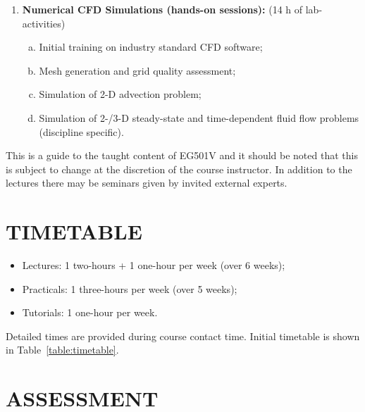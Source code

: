 \documentclass[12pts,a4paper,amsmath,amssymb,floatfix]{article}%
\begin{document}
\begin{enumerate}[{\bf Module 1}]
\item {\bf Numerical CFD Simulations (hands-on sessions):} (14 h of lab-activities)
   \begin{enumerate}[(a)]
      \item Initial training on industry standard CFD software;
      \item Mesh generation and grid quality assessment;
      \item Simulation of 2-D advection problem;
      \item Simulation of 2-/3-D steady-state and time-dependent fluid flow problems (discipline specific).
   \end{enumerate}

\end{enumerate}


\medskip
This is a guide to the taught content of EG501V and it should be noted that this is subject to change at the discretion of the course instructor. In addition to the lectures there may be seminars given by invited external experts.


\section{TIMETABLE}
\begin{itemize}
   \item Lectures: 1 two-hours + 1 one-hour per week (over 6 weeks);
   \item Practicals: 1 three-hours per week (over 5 weeks);
   \item Tutorials: 1 one-hour per week.
\end{itemize}
Detailed times are provided during course contact time. Initial timetable is shown in Table~\ref{table:timetable}.


\section{ASSESSMENT}
\end{document}
